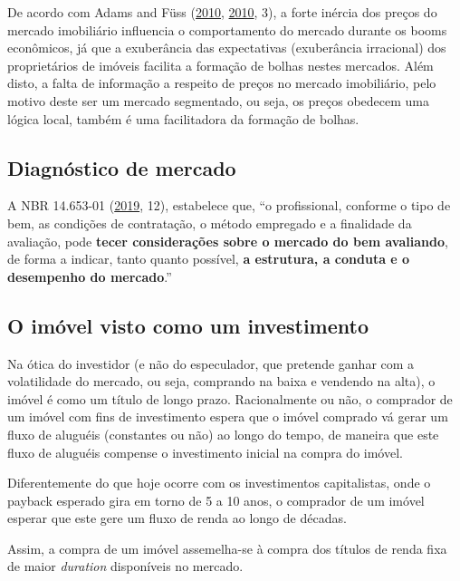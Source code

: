 \documentclass[
	12pt,				%
	oneside,			%
	a4paper,			%
	chapter=TITLE,		%
	section=TITLE,		%
	english,			%
	brazil				%
	]{abntex2}
\begin{document}
De acordo com Adams and Füss (\protect\hyperlink{ref-ADAMS201038}{2010}, \protect\hyperlink{ref-ADAMS201038}{2010}, 3), a forte inércia dos preços do
mercado imobiliário influencia o comportamento do mercado durante os booms
econômicos, já que a exuberância das expectativas (exuberância irracional) dos
proprietários de imóveis facilita a formação de bolhas nestes mercados. Além
disto, a falta de informação a respeito de preços no mercado imobiliário, pelo
motivo deste ser um mercado segmentado, ou seja, os preços obedecem uma
lógica local, também é uma facilitadora da formação de bolhas.

\hypertarget{diagnuxf3stico-de-mercado}{%
\subsection{Diagnóstico de mercado}\label{diagnuxf3stico-de-mercado}}

A NBR 14.653-01 (\protect\hyperlink{ref-NBR1465301}{2019}, 12), estabelece que, ``o profissional, conforme o
tipo de bem, as condições de contratação, o método empregado e a finalidade da
avaliação, pode \textbf{tecer considerações sobre o mercado do bem avaliando}, de
forma a indicar, tanto quanto possível, \textbf{a estrutura, a conduta e o desempenho
do mercado}.''

\hypertarget{o-imuxf3vel-visto-como-um-investimento}{%
\subsection{O imóvel visto como um investimento}\label{o-imuxf3vel-visto-como-um-investimento}}

Na ótica do investidor (e não do especulador, que pretende ganhar com a
volatilidade do mercado, ou seja, comprando na baixa e vendendo na alta), o
imóvel é como um título de longo prazo. Racionalmente ou não, o comprador de um
imóvel com fins de investimento espera que o imóvel comprado vá gerar um fluxo
de aluguéis (constantes ou não) ao longo do tempo, de maneira que este fluxo de
aluguéis compense o investimento inicial na compra do imóvel.

Diferentemente do que hoje ocorre com os investimentos capitalistas, onde o
payback esperado gira em torno de 5 a 10 anos, o comprador de um imóvel
esperar que este gere um fluxo de renda ao longo de décadas.

Assim, a compra de um imóvel assemelha-se à compra dos títulos de renda fixa de
maior \emph{duration} disponíveis no mercado.
\end{document}
